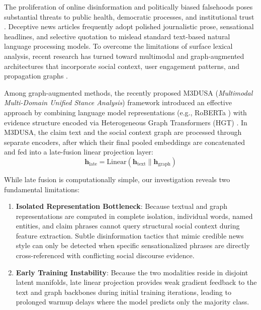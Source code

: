 \documentclass[conference]{IEEEtran}
\begin{document}
The proliferation of online disinformation and politically biased falsehoods poses substantial threats to public health, democratic processes, and institutional trust \cite{shu2020fakenewsnet}. Deceptive news articles frequently adopt polished journalistic prose, sensational headlines, and selective quotation to mislead standard text-based natural language processing models. To overcome the limitations of surface lexical analysis, recent research has turned toward multimodal and graph-augmented architectures that incorporate social context, user engagement patterns, and propagation graphs \cite{wang2018eann, zhou2020safe, bian2020bigcn}.

Among graph-augmented methods, the recently proposed M3DUSA (\textit{Multimodal Multi-Domain Unified Stance Analysis}) framework \cite{martirano2025m3dusa} introduced an effective approach by combining language model representations (e.g., RoBERTa \cite{liu2019roberta}) with evidence structure encoded via Heterogeneous Graph Transformers (HGT) \cite{hu2020heterogeneous}. In M3DUSA, the claim text and the social context graph are processed through separate encoders, after which their final pooled embeddings are concatenated and fed into a late-fusion linear projection layer:
\begin{equation}
\mathbf{h}_{\text{late}} = \text{Linear}(\mathbf{h}_{\text{text}} \parallel \mathbf{h}_{\text{graph}})
\end{equation}

While late fusion is computationally simple, our investigation reveals two fundamental limitations:
\begin{enumerate}
    \item \textbf{Isolated Representation Bottleneck}: Because textual and graph representations are computed in complete isolation, individual words, named entities, and claim phrases cannot query structural social context during feature extraction. Subtle disinformation tactics that mimic credible news style can only be detected when specific sensationalized phrases are directly cross-referenced with conflicting social discourse evidence.
    \item \textbf{Early Training Instability}: Because the two modalities reside in disjoint latent manifolds, late linear projection provides weak gradient feedback to the text and graph backbones during initial training iterations, leading to prolonged warmup delays where the model predicts only the majority class.
\end{enumerate}
\end{document}
